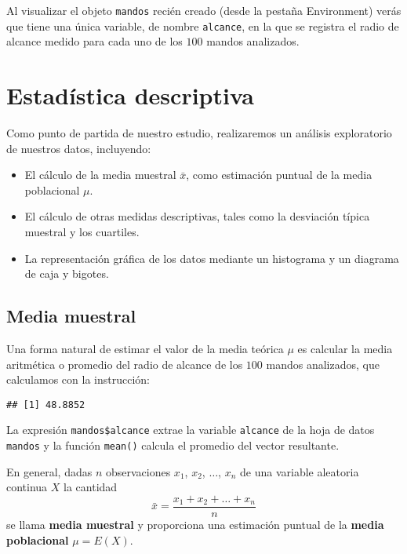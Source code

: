 \documentclass[
  degree=mecinf,
  title=normal,
  toc=normal,
  bib=normal]{mnye}
\newenvironment{Shaded}{\begin{snugshade}}{\end{snugshade}}
\newcommand{\FunctionTok}[1]{\textcolor[rgb]{0.00,0.00,0.00}{#1}}
\newcommand{\NormalTok}[1]{#1}
\newcommand{\SpecialCharTok}[1]{\textcolor[rgb]{0.00,0.00,0.00}{#1}}
\begin{document}
Al visualizar el objeto \texttt{mandos} recién creado (desde la pestaña Environment) verás que tiene una única variable, de nombre \texttt{alcance}, en la que se registra el radio de alcance medido para cada uno de los \(100\) mandos analizados.

\hypertarget{descriptive}{%
\section{Estadística descriptiva}\label{descriptive}}

Como punto de partida de nuestro estudio, realizaremos un análisis exploratorio de nuestros datos, incluyendo:

\begin{itemize}
\item
  El cálculo de la media muestral \(\bar x\), como estimación puntual de la media poblacional \(\mu\).
\item
  El cálculo de otras medidas descriptivas, tales como la desviación típica muestral y los cuartiles.
\item
  La representación gráfica de los datos mediante un histograma y un diagrama de caja y bigotes.
\end{itemize}

\hypertarget{mean}{%
\subsection{Media muestral}\label{mean}}

Una forma natural de estimar el valor de la media teórica \(\mu\) es calcular la media aritmética o promedio del radio de alcance de los \(100\) mandos analizados, que calculamos con la instrucción:

\begin{Shaded}
\end{Shaded}

\begin{verbatim}
## [1] 48.8852
\end{verbatim}

La expresión \texttt{mandos\$alcance} extrae la variable \texttt{alcance} de la hoja de datos \texttt{mandos} y la función \texttt{mean()} calcula el promedio del vector resultante.

En general, dadas \(n\) observaciones \(x_1\), \(x_2\), \(\dots\), \(x_n\) de una variable aleatoria continua \(X\) la cantidad
\[
    \bar{x} = \frac{x_1 + x_2 + \dots + x_n}{n}
\]
se llama \textbf{media muestral} y proporciona una estimación puntual de la \textbf{media poblacional} \(\mu = E(X)\).
\end{document}

